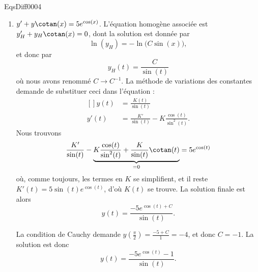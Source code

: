 \begin{corrige}{EqsDiff0004}
\begin{enumerate}
\item
$y'+y\cotan(x)=5 e^{\cos(x)}$. L'équation homogène associée est $y'_H+y_H\cotan(x)=0$, dont la solution est donnée par
\begin{equation}
	\ln(y_H)=-\ln\big( C\sin(x) \big),
\end{equation}
et donc par
\begin{equation}
	y_H(t)=\frac{ C }{ \sin(t) }
\end{equation}
où nous avons renommé $C\to C^{-1}$. La méthode de variations des constantes demande de substituer ceci dans l'équation :
\begin{equation}
	\begin{aligned}[]
		y(t)&=\frac{ K(t) }{ \sin(t) }\\
		y'(t)&=\frac{ K' }{ \sin(t) }-K\frac{ \cos(t) }{ \sin^2(t) }.
	\end{aligned}
\end{equation}
Nous trouvons
\begin{equation}
	\frac{ K' }{ \sin(t) }-\underbrace{K\frac{ \cos(t) }{ \sin^2(t) }+\frac{ K }{ \sin(t) }\cotan(t)}_{=0}=5 e^{\cos(t)}
\end{equation}
où, comme toujours, les termes en $K$ se simplifient, et il reste $K'(t)=5\sin(t) e^{\cos(t)}$, d'où $K(t)$ se trouve. La solution finale est alors
\begin{equation}
	y(t)=\frac{ -5 e^{\cos(t)+C} }{ \sin(t) }.
\end{equation}

La condition de Cauchy demande $y(\frac{ \pi }{ 2 })=\frac{ -5+C }{ 1 }=-4$, et donc $C=-1$. La solution est donc
\begin{equation}
	y(t)=\frac{ -5 e^{\cos(t)}-1 }{ \sin(t) }.
\end{equation}


\end{enumerate}
\end{corrige}
